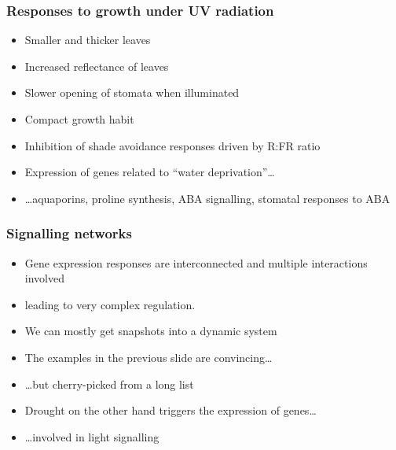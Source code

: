 \documentclass[10pt]{beamer}\usepackage[]{graphicx}\usepackage[]{xcolor}
\begin{document}
\begin{frame}
  \frametitle{Responses to growth under UV radiation}
   \begin{itemize}
    \item Smaller and thicker leaves
    \item Increased reflectance of leaves
    \item Slower opening of stomata when illuminated
    \item Compact growth habit
    \item Inhibition of shade avoidance responses driven by R:FR ratio
    \item Expression of genes related to ``water deprivation''\ldots
    \item \ldots aquaporins, proline synthesis, ABA signalling, stomatal responses to ABA
\end{itemize}
\end{frame}

\begin{frame}
  \frametitle{Signalling networks}
   \begin{itemize}
    \item Gene expression responses are interconnected and multiple interactions involved
    \item leading to very complex regulation.
    \item We can mostly get snapshots into a dynamic system
    \item The examples in the previous slide are convincing\ldots
    \item \ldots but cherry-picked from a long list
    \item Drought on the other hand triggers the expression of genes\ldots
    \item \ldots involved in light signalling
  \end{itemize}
\end{frame}

%
\end{document}
